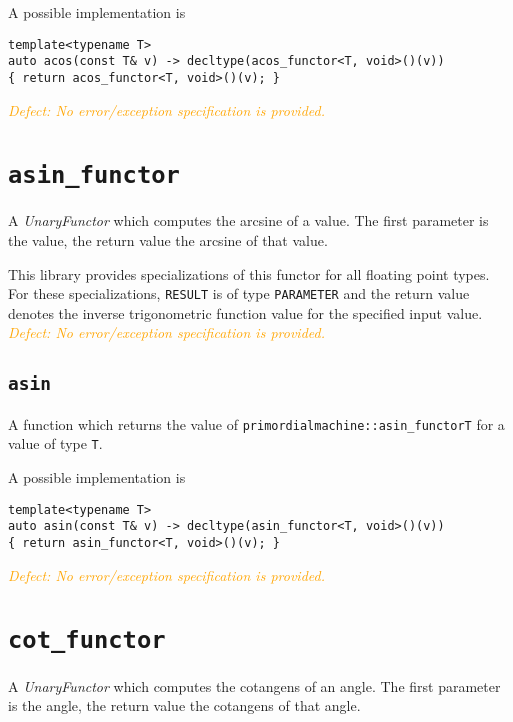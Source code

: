 \documentclass[oneside]{book}
\begin{document}
\noindent{}A possible implementation is
\begin{verbatim}
template<typename T>
auto acos(const T& v) -> decltype(acos_functor<T, void>()(v))
{ return acos_functor<T, void>()(v); }
\end{verbatim}

\noindent{}\textcolor{orange}{\textit{Defect: No error/exception specification is provided.}}
\section{\texttt{asin\_functor}}
A \textit{UnaryFunctor} which computes the
arcsine
of a value.
The first parameter is the value, the return value the arcsine of that value.

\noindent{}This library provides specializations of this functor for all floating point types.
For these specializations, \texttt{RESULT} is of type \texttt{PARAMETER} and the return value
denotes the inverse trigonometric function value for the specified input value.\\

\noindent{}\textcolor{orange}{\textit{Defect: No error/exception specification is provided.}}

\subsection{\texttt{asin}}
A function which returns the value of \texttt{primordialmachine::asin\_functor\textlangle T\textrangle}
for a value of type \texttt{T}.

\noindent{}A possible implementation is
\begin{verbatim}
template<typename T>
auto asin(const T& v) -> decltype(asin_functor<T, void>()(v))
{ return asin_functor<T, void>()(v); }
\end{verbatim}

\noindent{}\textcolor{orange}{\textit{Defect: No error/exception specification is provided.}}
\section{\texttt{cot\_functor}}
A \textit{UnaryFunctor} which computes the
cotangens of an angle.
The first parameter is the angle, the return value the cotangens of that angle.
\end{document}
